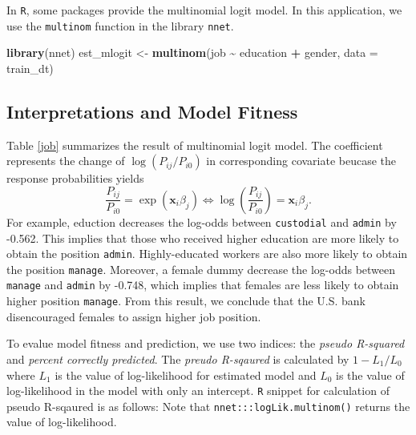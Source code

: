 \documentclass[
  12pt,
]{article}
\newenvironment{Shaded}{\begin{snugshade}}{\end{snugshade}}
\newcommand{\DataTypeTok}[1]{\textcolor[rgb]{0.13,0.29,0.53}{#1}}
\newcommand{\KeywordTok}[1]{\textcolor[rgb]{0.13,0.29,0.53}{\textbf{#1}}}
\newcommand{\NormalTok}[1]{#1}
\newcommand{\OperatorTok}[1]{\textcolor[rgb]{0.81,0.36,0.00}{\textbf{#1}}}
\newcommand{\StringTok}[1]{\textcolor[rgb]{0.31,0.60,0.02}{#1}}
\begin{document}
In \texttt{R}, some packages provide the multinomial logit model. In
this application, we use the \texttt{multinom} function in the library
\texttt{nnet}.

\begin{Shaded}
\begin{Highlighting}[]
\KeywordTok{library}\NormalTok{(nnet)}
\NormalTok{est\_mlogit \textless{}{-}}\StringTok{ }\KeywordTok{multinom}\NormalTok{(job }\OperatorTok{\textasciitilde{}}\StringTok{ }\NormalTok{education }\OperatorTok{+}\StringTok{ }\NormalTok{gender, }\DataTypeTok{data =}\NormalTok{ train\_dt)}
\end{Highlighting}
\end{Shaded}

\hypertarget{interpretations-and-model-fitness}{%
\subsection{Interpretations and Model
Fitness}\label{interpretations-and-model-fitness}}

Table \ref{job} summarizes the result of multinomial logit model. The
coefficient represents the change of \(\log(P_{ij}/P_{i0})\) in
corresponding covariate beucase the response probabilities yields
\begin{equation*}
    \frac{P_{ij}}{P_{i0}} = \exp(\mathbf{x}_i \beta_j)  \Leftrightarrow
    \log \left( \frac{P_{ij}}{P_{i0}} \right) = \mathbf{x}_i \beta_j.
\end{equation*} For example, eduction decreases the log-odds between
\texttt{custodial} and \texttt{admin} by -0.562. This implies that those
who received higher education are more likely to obtain the position
\texttt{admin}. Highly-educated workers are also more likely to obtain
the position \texttt{manage}. Moreover, a female dummy decrease the
log-odds between \texttt{manage} and \texttt{admin} by -0.748, which
implies that females are less likely to obtain higher position
\texttt{manage}. From this result, we conclude that the U.S. bank
disencouraged females to assign higher job position.

To evalue model fitness and prediction, we use two indices: the
\emph{pseudo R-squared} and \emph{percent correctly predicted}. The
\emph{preudo R-sqaured} is calculated by \(1 - L_1/L_0\) where \(L_1\)
is the value of log-likelihood for estimated model and \(L_0\) is the
value of log-likelihood in the model with only an intercept. \texttt{R}
snippet for calculation of pseudo R-sqaured is as follows: Note that
\texttt{nnet:::logLik.multinom()} returns the value of log-likelihood.
\end{document}

